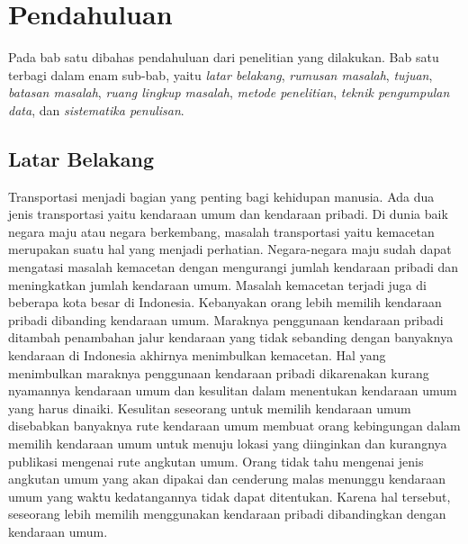 \chapter{Pendahuluan}
\label{chap:intro}

Pada bab satu dibahas pendahuluan dari penelitian yang dilakukan. Bab satu terbagi dalam enam sub-bab, yaitu \textit{latar belakang}, \textit{rumusan masalah}, \textit{tujuan}, \textit{batasan masalah}, \textit{ruang lingkup masalah}, \textit{metode penelitian}, \textit{teknik pengumpulan data}, dan \textit{sistematika penulisan}.

\section{Latar Belakang}
\label{sec:latar_belakang}
\hspace{0.5cm} Transportasi menjadi bagian yang penting bagi kehidupan manusia. Ada dua jenis transportasi yaitu kendaraan umum dan kendaraan pribadi. Di dunia baik negara maju atau negara berkembang, masalah transportasi yaitu kemacetan merupakan suatu hal yang menjadi perhatian. Negara-negara maju sudah dapat mengatasi masalah kemacetan dengan mengurangi jumlah kendaraan pribadi dan meningkatkan jumlah kendaraan umum. Masalah kemacetan terjadi juga di beberapa kota besar di Indonesia. Kebanyakan orang lebih memilih kendaraan pribadi dibanding kendaraan umum. Maraknya penggunaan kendaraan pribadi ditambah penambahan jalur kendaraan yang tidak sebanding dengan banyaknya kendaraan di Indonesia akhirnya menimbulkan kemacetan. Hal yang menimbulkan maraknya penggunaan kendaraan pribadi dikarenakan kurang nyamannya kendaraan umum dan kesulitan dalam menentukan kendaraan umum yang harus dinaiki. Kesulitan seseorang untuk memilih kendaraan umum disebabkan banyaknya rute kendaraan umum membuat orang kebingungan dalam memilih kendaraan umum untuk menuju lokasi yang diinginkan dan kurangnya publikasi mengenai rute angkutan umum. Orang tidak tahu mengenai jenis angkutan umum yang akan dipakai dan cenderung malas menunggu kendaraan umum yang waktu kedatangannya tidak dapat ditentukan. Karena hal tersebut, seseorang lebih memilih menggunakan kendaraan pribadi dibandingkan dengan kendaraan umum. 

